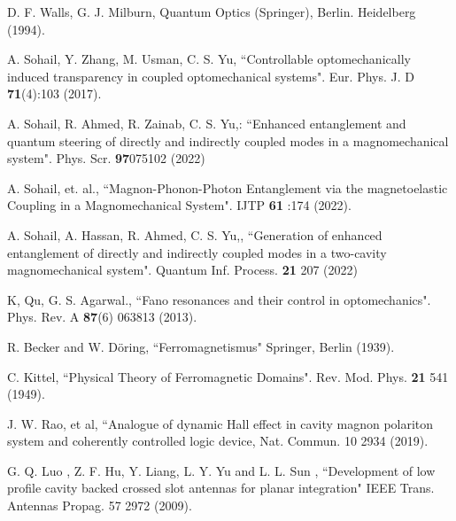 \documentclass[aps,pra,superscriptaddress,balancelastpage,twocolumn]{revtex4}
\begin{document}
\begin{thebibliography}{99}
 D. F. Walls, G. J. Milburn, Quantum Optics (Springer), Berlin.
Heidelberg (1994).

 A. Sohail, Y. Zhang, M. Usman, C. S. Yu, ``Controllable
optomechanically induced transparency in coupled optomechanical systems".
Eur. Phys. J. D \textbf{71}(4):103 (2017).

 A. Sohail, R. Ahmed, R. Zainab, C. S. Yu,: ``Enhanced
entanglement and quantum steering of directly and indirectly coupled modes
in a magnomechanical system". Phys. Scr. \textbf{97}075102 (2022)

 A. Sohail, et. al., ``Magnon-Phonon-Photon Entanglement via
the magnetoelastic Coupling in a Magnomechanical System". IJTP \textbf{61}%
:174 (2022).

 A. Sohail, A. Hassan, R. Ahmed, C. S. Yu,, ``Generation of
enhanced entanglement of directly and indirectly coupled modes in a
two-cavity magnomechanical system". Quantum Inf. Process. \textbf{21} 207
(2022)


 K, Qu, G. S. Agarwal., ``Fano resonances and their control in
optomechanics". Phys. Rev. A \textbf{87}(6) 063813 (2013).

 R. Becker and W. D\"{o}ring, ``Ferromagnetismus" Springer,
Berlin (1939).

 C. Kittel, ``Physical Theory of Ferromagnetic Domains". Rev.
Mod. Phys. \textbf{21} 541 (1949).

 J. W. Rao, et al, ``Analogue of dynamic Hall effect in cavity
magnon polariton system and coherently controlled logic device, Nat. Commun.
10 2934 (2019).

 G. Q. Luo , Z. F. Hu, Y. Liang, L. Y. Yu and L. L. Sun ,
``Development of low profile cavity backed crossed slot antennas for planar
integration" IEEE Trans. Antennas Propag. 57 2972 (2009).
\end{thebibliography}
\end{document}
